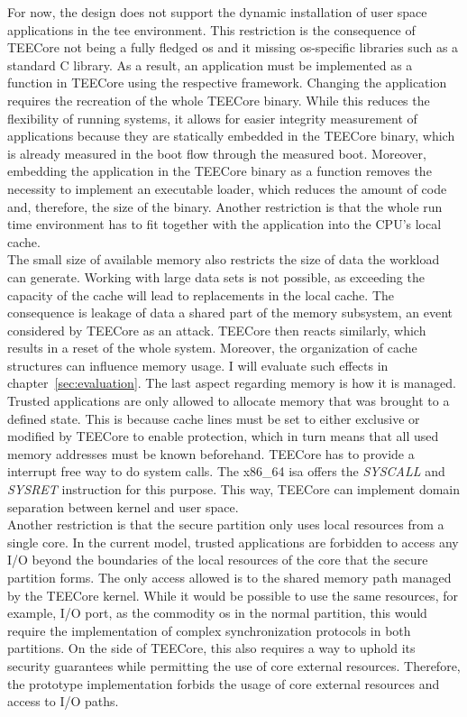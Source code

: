 For now, the design does not support the dynamic installation of user space
applications in the \gls{tee} environment. This restriction is the consequence
of TEECore not being a fully fledged \gls{os} and it missing \gls{os}-specific
libraries such as a standard C library. As a result, an application must be
implemented as a function in TEECore using the respective framework.
Changing the application requires the recreation of the whole TEECore binary.
While this reduces the flexibility of running systems, it allows for easier
integrity measurement of applications because they are statically embedded in
the TEECore binary, which is already measured in the boot flow through the
measured boot. Moreover, embedding the application in the TEECore binary as a
function removes the necessity to implement an executable loader, which reduces
the amount of code and, therefore, the size of the binary. Another restriction
is that the whole run time environment has to fit together with the application
into the CPU's local cache.\\

The small size of available memory also restricts the size of data the workload
can generate. Working with large data sets is not possible, as exceeding the
capacity of the cache will lead to replacements in the local cache. The
consequence is leakage of data a shared part of the memory subsystem, an event
considered by TEECore as an attack. TEECore then reacts similarly, which results
in a reset of the whole system. Moreover, the organization of cache structures
can influence memory usage. I will evaluate such effects in
chapter~\ref{sec:evaluation}. The last aspect regarding memory is how it is
managed. Trusted applications are only allowed to allocate memory that was
brought to a defined state. This is because cache lines must be set to either
exclusive or modified by TEECore to enable protection, which in turn means that
all used memory addresses must be known beforehand. TEECore has to provide a
interrupt free way to do system calls. The x86\_64 \gls{isa} offers the
\textit{SYSCALL} and \textit{SYSRET} instruction for this purpose. This way,
TEECore can implement domain separation between kernel and user space.\\

Another restriction is that the secure partition only uses local resources from
a single core. In the current model, trusted applications are forbidden to
access any I/O beyond the boundaries of the local resources of the core that the
secure partition forms. The only access allowed is to the shared memory path
managed by the TEECore kernel. While it would be possible to use the same
resources, for example, I/O port, as the commodity \gls{os} in the normal
partition, this would require the implementation of complex synchronization
protocols in both partitions. On the side of TEECore, this also requires a way
to uphold its security guarantees while permitting the use of core external
resources. Therefore, the prototype implementation forbids the usage of core
external resources and access to I/O paths.

